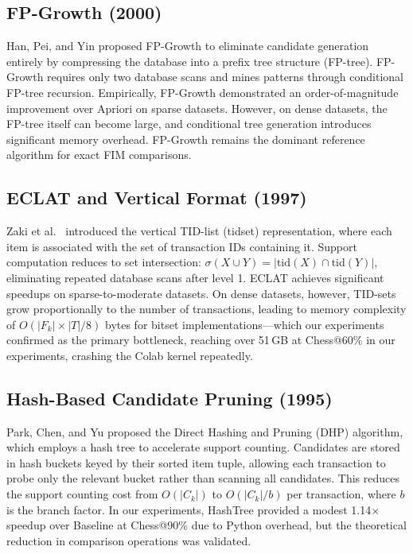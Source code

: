\documentclass[conference]{IEEEtran}
\begin{document}
\subsection{FP-Growth (2000)}
Han, Pei, and Yin \cite{han2000} proposed FP-Growth to eliminate
candidate generation entirely by compressing the database into a prefix
tree structure (FP-tree). FP-Growth requires only two database scans and
mines patterns through conditional FP-tree recursion. Empirically,
FP-Growth demonstrated an order-of-magnitude improvement over Apriori on
sparse datasets. However, on dense datasets, the FP-tree itself can
become large, and conditional tree generation introduces significant
memory overhead. FP-Growth remains the dominant reference algorithm for
exact FIM comparisons.

\subsection{ECLAT and Vertical Format (1997)}
Zaki et al.\ \cite{zaki1997} introduced the vertical TID-list (tidset)
representation, where each item is associated with the set of transaction
IDs containing it. Support computation reduces to set intersection:
$\sigma(X \cup Y) = |\text{tid}(X) \cap \text{tid}(Y)|$, eliminating
repeated database scans after level 1. ECLAT achieves significant
speedups on sparse-to-moderate datasets. On dense datasets, however,
TID-sets grow proportionally to the number of transactions, leading to
memory complexity of $O(|F_k| \times |T|/8)$ bytes for bitset
implementations---which our experiments confirmed as the primary
bottleneck, reaching over 51\,GB at Chess@60\% in our experiments,
crashing the Colab kernel repeatedly.

\subsection{Hash-Based Candidate Pruning (1995)}
Park, Chen, and Yu \cite{park1995} proposed the Direct Hashing and
Pruning (DHP) algorithm, which employs a hash tree to accelerate support
counting. Candidates are stored in hash buckets keyed by their sorted
item tuple, allowing each transaction to probe only the relevant bucket
rather than scanning all candidates. This reduces the support counting
cost from $O(|C_k|)$ to $O(|C_k|/b)$ per transaction, where $b$ is the
branch factor. In our experiments, HashTree provided a modest 1.14$\times$
speedup over Baseline at Chess@90\% due to Python overhead, but the
theoretical reduction in comparison operations was validated.
\end{document}
